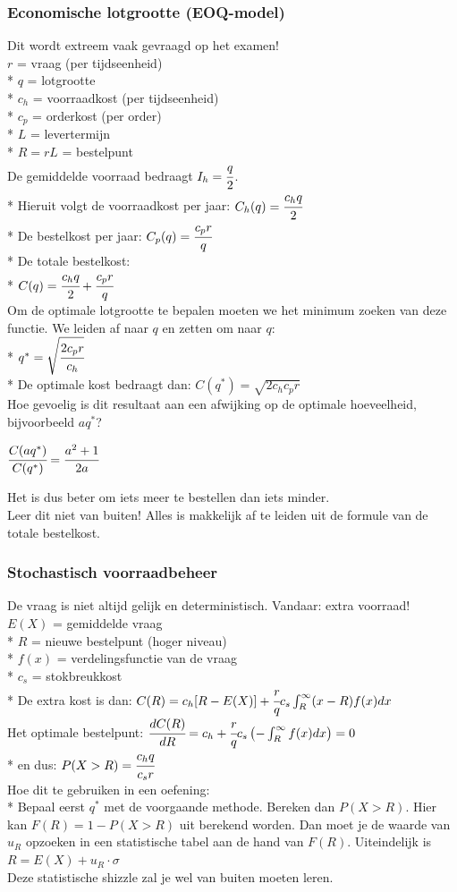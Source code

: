 \documentclass[12pt]{article}
\begin{document}
\subsubsection{Economische lotgrootte (EOQ-model)}
Dit wordt extreem vaak gevraagd op het examen!\\
$r$ = vraag (per tijdseenheid)\\*
$q$ = lotgrootte\\*
$c_h$ = voorraadkost (per tijdseenheid)\\*
$c_p$ = orderkost (per order)\\*
$L$ = levertermijn\\*
$R = rL$ = bestelpunt\\
De gemiddelde voorraad bedraagt $I_h = \cfrac{q}{2}$.\\*
Hieruit volgt de voorraadkost per jaar: $C_h(q) = \cfrac{c_hq}{2}$\\*
De bestelkost per jaar: $C_p(q) = \cfrac{c_pr}{q}$\\*
De totale bestelkost:\\*
$C(q) = \cfrac{c_hq}{2} + \cfrac{c_pr}{q}$\\
Om de optimale lotgrootte te bepalen moeten we het minimum zoeken van deze functie. We leiden af naar $q$ en zetten om naar $q$:\\*
$q^* = \sqrt{\cfrac{2c_pr}{c_h}}$\\*
De optimale kost bedraagt dan: $C(q^*) = \sqrt{2c_hc_pr}$\\
Hoe gevoelig is dit resultaat aan een afwijking op de optimale hoeveelheid, bijvoorbeeld $aq^*$?
\begin{center}
$\cfrac{C(aq^*)}{C(q^*)} = \cfrac{a^2+1}{2a}$
\end{center}
Het is dus beter om iets meer te bestellen dan iets minder.\\
Leer dit niet van buiten! Alles is makkelijk af te leiden uit de formule van de totale bestelkost.
\subsubsection{Stochastisch voorraadbeheer}
De vraag is niet altijd gelijk en deterministisch. Vandaar: extra voorraad!\\
$E(X)$ = gemiddelde vraag\\*
$R$ = nieuwe bestelpunt (hoger niveau)\\*
$f(x)$ = verdelingsfunctie van de vraag\\*
$c_s$ = stokbreukkost\\*
De extra kost is dan: $C(R) = c_h[R-E(X)] + \cfrac{r}{q}c_s\int_R^\infty(x-R)f(x)dx$\\
Het optimale bestelpunt: $\cfrac{dC(R)}{dR} = c_h + \cfrac{r}{q}c_s\left(-\int_R^\infty f(x)dx\right) = 0$\\*
en dus: $P(X>R) = \cfrac{c_hq}{c_sr}$\\
Hoe dit te gebruiken in een oefening:\\*
Bepaal eerst $q^*$ met de voorgaande methode. Bereken dan $P(X>R)$. Hier kan $F(R) = 1-P(X>R)$ uit berekend worden. Dan moet je de waarde van $u_R$ opzoeken in een statistische tabel aan de hand van $F(R)$. Uiteindelijk is $R = E(X) + u_R \cdot \sigma$\\
Deze statistische shizzle zal je wel van buiten moeten leren.
\end{document}
